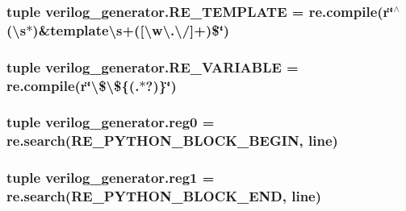 \hypertarget{namespaceverilog__generator_a6f7123cb341845c3498a34ba5e3c0067}{
\subsubsection[{R\-E\-\_\-\-T\-E\-M\-P\-L\-A\-T\-E}]{\setlength{\rightskip}{0pt plus 5cm}tuple verilog\-\_\-generator.\-R\-E\-\_\-\-T\-E\-M\-P\-L\-A\-T\-E = re.\-compile(r\char`\"{}$^\wedge$(\textbackslash{}s$\ast$)\&template\textbackslash{}s+(\mbox{[}\textbackslash{}w\textbackslash{}.\textbackslash{}/\mbox{]}+)\$\char`\"{})}}\label{namespaceverilog__generator_a6f7123cb341845c3498a34ba5e3c0067}
\hypertarget{namespaceverilog__generator_ac42330437a8a95b3a482073d5c6791d3}{
\subsubsection[{R\-E\-\_\-\-V\-A\-R\-I\-A\-B\-L\-E}]{\setlength{\rightskip}{0pt plus 5cm}tuple verilog\-\_\-generator.\-R\-E\-\_\-\-V\-A\-R\-I\-A\-B\-L\-E = re.\-compile(r\char`\"{}\textbackslash{}\$\textbackslash{}\$\{(.$\ast$?)\}\char`\"{})}}\label{namespaceverilog__generator_ac42330437a8a95b3a482073d5c6791d3}
\hypertarget{namespaceverilog__generator_aa0a59f9d26b1ec9895aaef184d00d045}{
\subsubsection[{reg0}]{\setlength{\rightskip}{0pt plus 5cm}tuple verilog\-\_\-generator.\-reg0 = re.\-search({\bf R\-E\-\_\-\-P\-Y\-T\-H\-O\-N\-\_\-\-B\-L\-O\-C\-K\-\_\-\-B\-E\-G\-I\-N}, line)}}\label{namespaceverilog__generator_aa0a59f9d26b1ec9895aaef184d00d045}
\hypertarget{namespaceverilog__generator_a7f900619fa2fade7a25b6a381d043e00}{
\subsubsection[{reg1}]{\setlength{\rightskip}{0pt plus 5cm}tuple verilog\-\_\-generator.\-reg1 = re.\-search({\bf R\-E\-\_\-\-P\-Y\-T\-H\-O\-N\-\_\-\-B\-L\-O\-C\-K\-\_\-\-E\-N\-D}, line)}}\label{namespaceverilog__generator_a7f900619fa2fade7a25b6a381d043e00}
